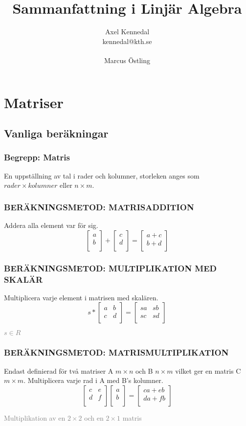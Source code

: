 \documentclass[10pt]{article}
\author{Axel Kennedal \\ kennedal@kth.se \\\\
Marcus Östling \\} %
\title{Sammanfattning i Linjär Algebra}
\newcommand{\indelning} [1] {\subsection{#1}}
\newcommand{\begrepp} [1] {\subsubsection{\textcolor{Cerulean}{Begrepp: #1}}}
\newcommand{\metod} [1] {\subsubsection{\uppercase{\small{Beräkningsmetod: #1}}}}
\newcommand{\comment} [1] {\begin{center}\textcolor{Gray}{#1} \end{center}}
\begin{document}
\maketitle
\tableofcontents
\newpage

\twocolumn

\section{Matriser}
\indelning{Vanliga beräkningar}
\begrepp{Matris}
En uppställning av tal i rader och kolumner, storleken anges som $rader \times kolumner$ eller $n \times m$.

\metod{Matrisaddition}
Addera alla element var för sig.
\begin{displaymath}
\begin{bmatrix}
a \\
b \\
\end{bmatrix}
+
\begin{bmatrix}
c \\
d \\
\end{bmatrix}
=
\begin{bmatrix}
a + c \\
b + d \\
\end{bmatrix}
\end{displaymath}

\metod{Multiplikation med skalär}
Multiplicera varje element i matrisen med skalären.
\begin{displaymath}
s *
\begin{bmatrix}
a & b \\
c & d \\
\end{bmatrix}
=
\begin{bmatrix}
sa & sb \\
sc & sd \\
\end{bmatrix}
\end{displaymath}
\comment{$s\in R$}

\metod{Matrismultiplikation}
Endast definierad för två matriser A $m \times n$ och B $n \times  m$ vilket ger en matris C $m \times m$.
Multiplicera varje rad i A med B's kolumner.
\begin{displaymath}
\begin{bmatrix}
c & e \\
d & f \\
\end{bmatrix}
\begin{bmatrix}
a \\
b \\
\end{bmatrix}
=
\begin{bmatrix}
ca + eb \\
da + fb \\
\end{bmatrix}
\end{displaymath}
\comment{Multiplikation av en $2 \times 2$ och en $2 \times 1$ matris}
\end{document}
